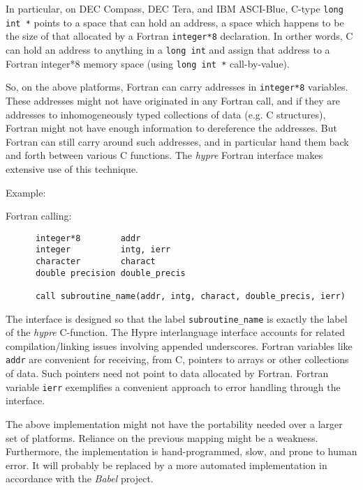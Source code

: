 \vspace{0.2in}

In particular, on DEC Compass, DEC Tera, and IBM ASCI-Blue, C-type
\verb+long int *+ points to a space that can hold an address, a space
which happens to be the size of that allocated by a Fortran
\verb+integer*8+ declaration.
In orther words, C can hold an address to anything in a \verb+long int+ and
assign that address to a Fortran integer*8 memory space (using \verb+long int *+ call-by-value).

So, on the above platforms, Fortran can carry addresses in \verb+integer*8+
variables.  These addresses might not have originated in any Fortran call,
and if they are addresses to inhomogeneously typed collections of data
(e.g. C structures), Fortran might not have enough information to dereference
the addresses.  But Fortran can still carry around such addresses, and in
particular hand them back and forth between various C functions.  The
{\slshape hypre} Fortran interface makes extensive use of this technique.

\vspace{0.1in}

\noindent Example:

\vspace{0.1in}

  Fortran calling:
\begin{verbatim}
      integer*8        addr
      integer          intg, ierr
      character        charact
      double precision double_precis

      call subroutine_name(addr, intg, charact, double_precis, ierr)
\end{verbatim}

The interface is designed so that the label \verb+subroutine_name+ is exactly
the label of the {\slshape hypre} C-function.  The Hypre interlanguage interface
accounts for related compilation/linking issues involving appended
underscores.  Fortran variables like \verb+addr+
are convenient for receiving, from C, pointers to arrays or other
collections of data.  Such pointers need not point to data allocated by Fortran.
Fortran variable \verb+ierr+ exemplifies a convenient approach to error
handling through the interface.

The above implementation might not have the portability needed over a larger set
of platforms.  Reliance on the previous mapping might be a weakness.
Furthermore,
the implementation is hand-programmed, slow, and prone to human error.
It will probably be replaced by a more automated implementation in accordance
with the {\slshape Babel} project. 

